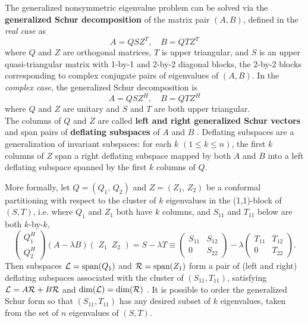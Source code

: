 The generalized nonsymmetric eigenvalue problem can be solved via the
{\bf generalized Schur decomposition}
 of the matrix pair $(A, B)$, defined in the {\it real case} as
\[
A = Q S Z^T, \quad B = Q T Z^T
\]
where $Q$ and $Z$ are orthogonal matrices, $T$ is upper triangular,
and $S$ is an upper quasi-triangular matrix with 1-by-1 and 2-by-2 diagonal
blocks, the 2-by-2 blocks corresponding to complex conjugate pairs of eigenvalues
of $(A, B)$.  In the {\it complex case}, the generalized Schur decomposition is
\[
        A = Q S Z^H, \quad B = Q T Z^H
\]
where $Q$ and $Z$ are unitary and $S$ and $T$ are both upper triangular. \\

The columns of $Q$ and $Z$ are called {\bf left and right generalized Schur
vectors}
and span pairs of {\bf deflating subspaces} of $A$ and $B$
\cite{stewart72}.
Deflating subspaces are a generalization of invariant subspaces:
for each $k$ $(1\leq k \leq n)$, the first $k$ columns of $Z$ span a right
deflating subspace mapped by both $A$ and $B$ into a left deflating subspace
spanned by the first $k$ columns of $Q$.

More formally, let $Q = (Q_1,\,Q_2)$ and $Z = (Z_1,\,Z_2)$ be a conformal
partitioning with respect to the cluster of $k$ eigenvalues in the
(1,1)-block of $(S, T)$, i.e. where $Q_1$ and $Z_1$ both have $k$ columns,
and $S_{11}$ and $T_{11}$ below are both $k$-by-$k$,
\[
        \left( \begin{array}{c} Q^H_1 \\ Q^H_2 \end{array} \right)
            (A - \lambda B) \left( \,\, Z_1 \,\,\, Z_2 \,\, \right)
            = S - \lambda T \equiv
        \left( \begin{array}{cc} S_{11} & S_{12} \\
                                     0  & S_{22} \end{array} \right)
        - \lambda \left( \begin{array}{cc} T_{11} & T_{12} \\
                                               0  & T_{22} \end{array} \right).
\]
Then subspaces ${\cal{L}} = \mbox{span}(Q_1)$ and ${\cal{R}} = \mbox{span}(Z_1)$
form a pair of (left and right) deflating subspaces associated with the
cluster of $(S_{11},T_{11})$, satisfying ${\cal{L}} = A{\cal{R}} + B{\cal{R}}$
and $\mbox{dim}(\cal{L}) = \mbox{dim}(\cal{R})$ \cite{stewart73,stewartsun90}.
It is possible to order the generalized Schur form so that
$(S_{11}, T_{11})$ has any desired subset of $k$ eigenvalues,
taken from the set of $n$ eigenvalues of $(S,T)$.

